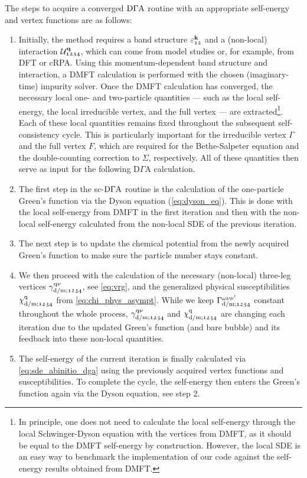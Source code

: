 \documentclass[../../main.tex]{subfiles}
\begin{document}
The steps to acquire a converged $\text{D}\Gamma\text{A}$ routine with an appropriate self-energy and vertex functions are as follows:
\begin{enumerate}
	\item Initially, the method requires a band structure $\varepsilon^{\textbf{k}}_{\mathfrak{12}}$ and a (non-local) interaction $\mathcal{U}^{\textbf{q}}_{\mathfrak{1234}}$, which can come from model studies or, for example, from DFT or cRPA. Using this momentum-dependent band structure and interaction, a DMFT calculation is performed with the chosen (imaginary-time) impurity solver. Once the DMFT calculation has converged, the necessary local one- and two-particle quantities --- such as the local self-energy, the local irreducible vertex, and the full vertex --- are extracted\footnote{In principle, one does not need to calculate the local self-energy through the local Schwinger-Dyson equation with the vertices from DMFT, as it should be equal to the DMFT self-energy by construction. However, the local SDE is an easy way to benchmark the implementation of our code against the self-energy results obtained from DMFT.}. Each of these local quantities remains fixed throughout the subsequent self-consistency cycle. This is particularly important for the irreducible vertex $\Gamma$ and the full vertex $F$, which are required for the Bethe-Salpeter equation and the double-counting correction to $\Sigma$, respectively. All of these quantities then serve as input for the following $\mathrm{D}\Gamma\mathrm{A}$ calculation.
	\item The first step in the sc-$\text{D}\Gamma\text{A}$ routine is the calculation of the one-particle Green's function via the Dyson equation (\ref{eq:dyson_eq}). This is done with the local self-energy from DMFT in the first iteration and then with the non-local self-energy calculated from the non-local SDE of the previous iteration.
	\item The next step is to update the chemical potential from the newly acquired Green's function to make sure the particle number stays constant. 
	\item We then proceed with the calculation of the necessary (non-local) three-leg vertices $\gamma^{\text{q}\nu}_{\text{d}/\text{m};\mathfrak{1234}}$, see \eqref{eq:vrg}, and the generalized physical susceptibilities $\chi^{\text{q}}_{\text{d}/\text{m};\mathfrak{1234}}$ from \eqref{eq:chi_phys_asympt}. While we keep $\Gamma^{\omega\nu\nu'}_{\text{d}/\text{m};\mathfrak{1234}}$ constant throughout the whole process, $\gamma^{\text{q}\nu}_{\text{d}/\text{m};\mathfrak{1234}}$ and $\chi^{\text{q}}_{\text{d}/\text{m};\mathfrak{1234}}$ are changing each iteration due to the updated Green's function (and bare bubble) and its feedback into these non-local quantities.
	\item The self-energy of the current iteration is finally calculated via \eqref{eq:sde_abinitio_dga} using the previously acquired vertex functions and susceptibilities. To complete the cycle, the self-energy then enters the Green's function again via the Dyson equation, see step 2.
\end{enumerate}
\end{document}
